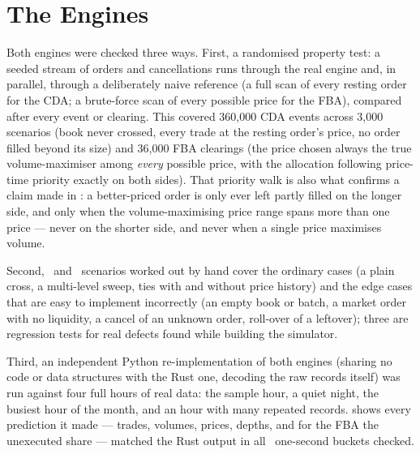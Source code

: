 \section{The Engines}
\label{sec:testfba}

Both engines were checked three ways. First, a randomised property test: a seeded
stream of orders and cancellations runs through the real engine and, in parallel,
through a deliberately naive reference (a full scan of every resting order for the
CDA; a brute-force scan of every possible price for the FBA), compared after every
event or clearing. This covered 360,000 CDA events across 3,000 scenarios (book
never crossed, every trade at the resting order's price, no order filled beyond its
size) and 36,000 FBA clearings (the price chosen always the true volume-maximiser
among \emph{every} possible price, with the allocation following price-time
priority exactly on both sides). That priority walk is also what confirms a claim
made in : a better-priced order is only ever left partly filled
on the longer side, and only when the volume-maximising price range spans more
than one price --- never on the shorter side, and never when a single price
maximises volume.

Second, \VerChecklistCda\ and \VerChecklistFba\ scenarios worked out by hand cover
the ordinary cases (a plain cross, a multi-level sweep, ties with and without price
history) and the edge cases that are easy to implement incorrectly (an empty book or batch, a
market order with no liquidity, a cancel of an unknown order, roll-over of a
leftover); three are regression tests for real defects found while building the
simulator.

Third, an independent Python re-implementation of both engines (sharing no code or
data structures with the Rust one, decoding the raw records itself) was run against
four full hours of real data: the sample hour, a quiet night, the busiest hour of
the month, and an hour with many repeated records.  shows every
prediction it made --- trades, volumes, prices, depths, and for the FBA the
unexecuted share --- matched the Rust output in all \VerRefBuckets\ one-second
buckets checked.

